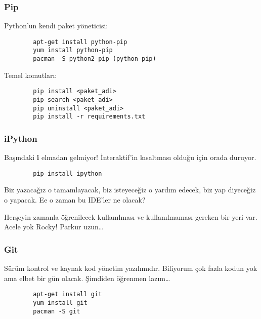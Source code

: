 \documentclass[10pt, compress]{beamer}
\begin{document}


\begin{frame}[fragile]
\frametitle{Pip}
    Python'un kendi paket yöneticisi:
      \begin{verbatim}
        apt-get install python-pip
        yum install python-pip
        pacman -S python2-pip (python-pip)
      \end{verbatim}    
    Temel komutları:
    \begin{verbatim}
        pip install <paket_adi>
        pip search <paket_adi>
        pip uninstall <paket_adi>
        pip install -r requirements.txt
    \end{verbatim}       
\end{frame}


\begin{frame}[fragile]
\frametitle{iPython}
    Başındaki \textbf{i} elmadan gelmiyor! İnteraktif'in kısaltması olduğu için orada duruyor.
    \begin{verbatim}
        pip install ipython
    \end{verbatim}
    Biz yazacağız o tamamlayacak, biz isteyeceğiz o yardım edecek, biz yap diyeceğiz o yapacak. Ee o zaman bu IDE'ler ne olacak?
    
    Herşeyin zamanla öğrenilecek kullanılması ve kullanılmaması gereken bir yeri var. Acele yok Rocky! Parkur uzun\ldots
\end{frame}

\begin{frame}[fragile]
\frametitle{Git}
    Sürüm kontrol ve kaynak kod yönetim yazılımıdır. Biliyorum çok fazla kodun yok ama elbet bir gün olacak. Şimdiden öğrenmen lazım\ldots
    \begin{verbatim}
        apt-get install git
        yum install git
        pacman -S git
    \end{verbatim}
\end{frame}

\end{document}
